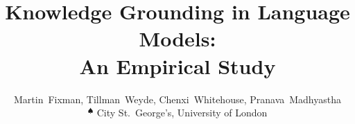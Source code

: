 \documentclass[a4paper,11pt]{article}
\title{Knowledge Grounding in Language Models: \\ An Empirical Study}
\author{%
	Martin~Fixman\spade{}, Tillman~Weyde\spade{}, Chenxi~Whitehouse\spade{}, Pranava~Madhyastha\spade{} \\
	$\phantom{}^\spadesuit{}$ City St.\ George's, University of London%
}
\begin{document}
\maketitle{}

\begin{abstract}
	
\end{abstract}













\appendix{}




\end{document}
